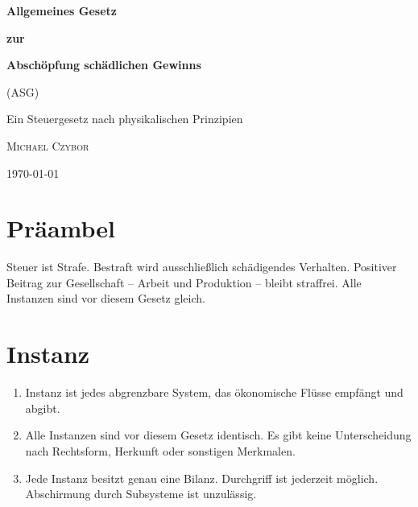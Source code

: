 \documentclass[11pt,a4paper]{article}
\begin{document}
\begin{titlepage}
\centering
\vspace*{3cm}

{\Huge\bfseries Allgemeines Gesetz\par}
\vspace{0.5cm}
{\Huge\bfseries zur\par}
\vspace{0.5cm}
{\Huge\bfseries Abschöpfung schädlichen Gewinns\par}
\vspace{1cm}
{\LARGE (ASG)\par}

\vspace{2cm}

{\large Ein Steuergesetz nach physikalischen Prinzipien\par}

\vspace{2cm}

{\Large\textsc{Michael Czybor}\par}

\vfill

{\large \today\par}
\vspace{1cm}
\end{titlepage}

\section*{Präambel}

Steuer ist Strafe. Bestraft wird ausschließlich schädigendes Verhalten. Positiver Beitrag zur Gesellschaft -- Arbeit und Produktion -- bleibt straffrei. Alle Instanzen sind vor diesem Gesetz gleich.

\tableofcontents
\newpage

\section{Instanz}

\begin{enumerate}
  \item[(1)] Instanz ist jedes abgrenzbare System, das ökonomische Flüsse empfängt und abgibt.
  
  \item[(2)] Alle Instanzen sind vor diesem Gesetz identisch. Es gibt keine Unterscheidung nach Rechtsform, Herkunft oder sonstigen Merkmalen.
  
  \item[(3)] Jede Instanz besitzt genau eine Bilanz. Durchgriff ist jederzeit möglich. Abschirmung durch Subsysteme ist unzulässig.
\end{enumerate}
\end{document}
